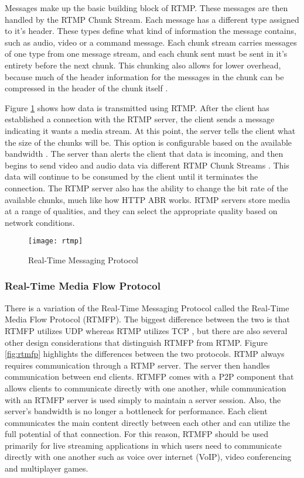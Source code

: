 \documentclass[12pt]{article}
\begin{document}
Messages make up the basic building block of RTMP.  These messages are then handled by the RTMP Chunk Stream.  Each message has a different type assigned to it's header.  These types define what kind of information the message contains, such as audio, video or a command message.  Each chunk stream carries messages of one type from one message stream, and each chunk sent must be sent in it's entirety before the next chunk.  This chunking also allows for lower overhead, because much of the header information for the messages in the chunk can be compressed in the header of the chunk itself \cite{rtmp_def}.

Figure \ref{fig:rtmp} shows how data is transmitted using RTMP.  After the client has established a connection with the RTMP server, the client sends a message indicating it wants a media stream.  At this point, the server tells the client what the size of the chunks will be.  This option is configurable based on the available bandwidth \cite{rtmp_def}.  The server than alerts the client that data is incoming, and then begins to send video and audio data via different RTMP Chunk Streams \cite{6469981}.  This data will continue to be consumed by the client until it terminates the connection.  The RTMP server also has the ability to change the bit rate of the available chunks, much like how HTTP ABR works.  RTMP servers store media at a range of qualities, and they can select the appropriate quality based on network conditions.

\begin{figure}[htp]
  \begin{center}
    \texttt{[image: rtmp]}
    \caption{Real-Time Messaging Protocol}
    \label{fig:rtmp}
  \end{center}
\end{figure}

\subsubsection{Real-Time Media Flow Protocol}
There is a variation of the Real-Time Messaging Protocol called the Real-Time Media Flow Protocol (RTMFP).  The biggest difference between the two is that RTMFP utilizes UDP whereas RTMP utilizes TCP \cite{rtmfp_def}, but there are also several other design considerations that distinguish RTMFP from RTMP.  Figure \ref{fig:rtmfp} highlights the differences between the two protocols.  RTMP always requires communication through a RTMP server.  The server then handles communication between end clients.  RTMFP comes with a P2P component that allows clients to communicate directly with one another, while communication with an RTMFP server is used simply to maintain a server session.  Also, the server's bandwidth is no longer a bottleneck for performance.  Each client communicates the main content directly between each other and can utilize the full potential of that connection.  For this reason, RTMFP should be used primarily for live streaming applications in which users need to communicate directly with one another such as voice over internet (VoIP), video conferencing and multiplayer games.
\end{document}

